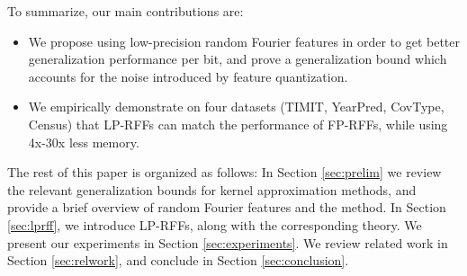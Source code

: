 
To summarize, our main contributions are:
\begin{itemize}
	\item We propose using low-precision random Fourier features in order to get better generalization performance per bit, and prove a generalization bound which accounts for the noise introduced by feature quantization.
	\item We empirically demonstrate on four datasets (TIMIT, YearPred, CovType, Census) that LP-RFFs can match the performance of FP-RFFs, while using 4x-30x less memory.
\end{itemize}

The rest of this paper is organized as follows: In Section \ref{sec:prelim} we review the relevant generalization bounds for kernel approximation methods, and provide a brief overview of random Fourier features and the \Nystrom method.  In Section \ref{sec:lprff}, we introduce LP-RFFs, along with the corresponding theory. We present our experiments in Section \ref{sec:experiments}.  We review related work in Section \ref{sec:relwork}, and conclude in Section \ref{sec:conclusion}.








